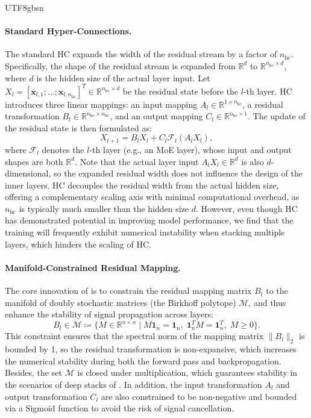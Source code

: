 \begin{CJK*}{UTF8}{gbsn}
\paragraph{Standard Hyper-Connections.}
The standard HC expands the width of the residual stream by a factor of $n_{\text{hc}}$. 
Specifically, the shape of the residual stream is expanded from $\mathbb{R}^{d}$ to $\mathbb{R}^{n_{\text{hc}} \times d}$, where $d$ is the hidden size of the actual layer input. 
Let $X_l = [\mathbf{x}_{l,1}; \ldots; \mathbf{x}_{l,n_{\text{hc}}}]^T \in \mathbb{R}^{n_{\text{hc}} \times d}$ be the residual state before the $l$-th layer. 
HC introduces three linear mappings: an input mapping $A_{l} \in \mathbb{R}^{1 \times n_{\text{hc}}}$, a residual transformation $B_{l} \in \mathbb{R}^{n_{\text{hc}} \times n_{\text{hc}}}$, and an output mapping $C_{l} \in \mathbb{R}^{n_{\text{hc}} \times 1}$. 
The update of the residual state is then formulated as:
\begin{equation}
    X_{l+1} = B_{l} X_l + C_{l} \mathcal{F}_{l}(A_{l} X_l),
\end{equation}
where $\mathcal{F}_{l}$ denotes the $l$-th layer (e.g., an MoE layer), whose input and output shapes are both $\mathbb{R}^{d}$.
Note that the actual layer input $A_{l} X_l \in \mathbb{R}^{d}$ is also $d$-dimensional, so the expanded residual width does not influence the design of the inner layers. 
HC decouples the residual width from the actual hidden size, offering a complementary scaling axis with minimal computational overhead, as $n_{\text{hc}}$ is typically much smaller than the hidden size $d$.
However, even though HC has demonstrated potential in improving model performance, we find that the training will frequently exhibit numerical instability when stacking multiple layers, which hinders the scaling of HC.

\paragraph{Manifold-Constrained Residual Mapping.}
The core innovation of \mhc{} is to constrain the residual mapping matrix $B_l$ to the manifold of doubly stochastic matrices (the Birkhoff polytope) $\mathcal{M}$, and thus enhance the stability of signal propagation across layers:
\begin{equation}
    B_l \in \mathcal{M} \coloneq \{ M \in \mathbb{R}^{n \times n} \mid M\mathbf{1}_n = \mathbf{1}_n, \; \mathbf{1}_n^T M = \mathbf{1}_n^T, \; M \geq 0 \}.
\end{equation}
This constraint ensures that the spectral norm of the mapping matrix $\|B_l\|_2$ is bounded by 1, so the residual transformation is non-expansive, which increases the numerical stability during both the forward pass and backpropagation.
Besides, the set $\mathcal{M}$ is closed under multiplication, which guarantees stability in the scenarios of deep stacks of \mhc{}. 
In addition, the input transformation $A_l$ and output transformation $C_l$ are also constrained to be non-negative and bounded via a Sigmoid function to avoid the risk of signal cancellation.


\end{CJK*}
